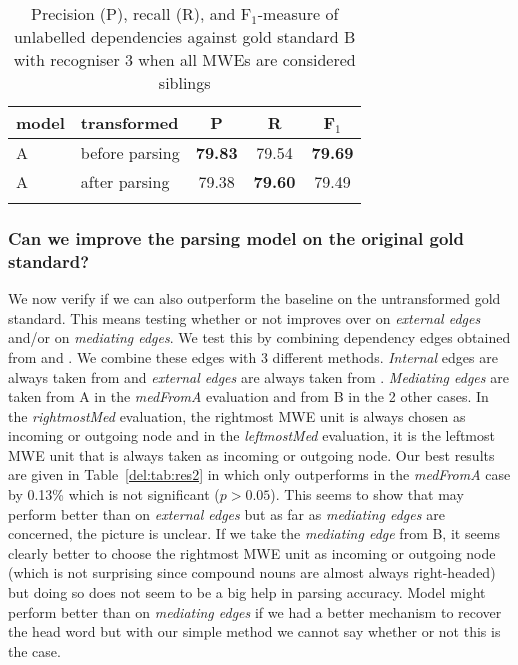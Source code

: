 \documentclass[output=paper]{langsci/langscibook}
\begin{document}
\begin{table}[h]
    \centering
    \begin{tabular}{l l c c c} %
      \lsptoprule
        \textnormal{model}
        & \textnormal{transformed}
        & \textnormal{P}
        & \textnormal{R}
        & \textnormal{F$_1$}
        \\ %
        \midrule
        A & before parsing &\textbf{79.83} & 79.54  & \textbf{79.69} \\
        A & after parsing &79.38  &\textbf{79.60}  & 79.49 \tabularnewline %
        \lspbottomrule
    \end{tabular}
    \caption{Precision (P), recall (R), and F$_1$-measure of unlabelled dependencies against gold standard B with recogniser 3 when all MWEs are considered siblings \label{del:tab:res1tris}}
\end{table}

\subsubsection{Can we improve the parsing model on the original gold standard?}
\indent We now verify if we can also outperform the baseline on the untransformed gold standard. This means testing whether or not {\modelB} improves over {\modelA} on \textit{external edges} and/or on \textit{mediating edges}. We test this by combining dependency edges obtained from {\modelA} and {\modelB}. We combine these edges with 3 different methods. \textit{Internal} edges are always taken from {\modelA} and \textit{external edges} are always taken from {\modelB}. \textit{Mediating edges} are taken from A in the \textit{medFromA} evaluation and from B in the 2 other cases. In the \textit{rightmostMed} evaluation, the rightmost MWE unit is always chosen as incoming or outgoing node and in the \textit{leftmostMed} evaluation, it is the leftmost MWE unit that is always taken as incoming or outgoing node. Our best results are given in Table~\ref{del:tab:res2} in which {\modelB} only outperforms {\modelA} in the \textit{medFromA} case by 0.13\% which is not significant ($p>0.05$). This seems to show that {\modelB} may perform better than {\modelA} on \textit{external edges} but as far as \textit{mediating edges} are concerned, the picture is unclear. If we take the \textit{mediating edge} from B, it seems clearly better to choose the rightmost MWE unit as incoming or outgoing node (which is not surprising since compound nouns are almost always right-headed) but doing so does not seem to be a big help in parsing accuracy. Model might perform better than {\modelA} on \textit{mediating edges} if we had a better mechanism to recover the head word but with our simple method we cannot say whether or not this is the case.
\end{document}
